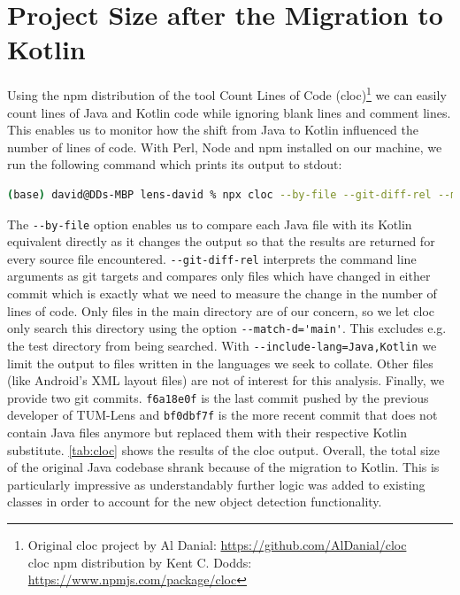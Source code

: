 \documentclass[
			   fontsize=11pt,
               paper=a4,
               bibliography=totoc,
               idxtotoc,
               headsepline,
               footsepline,
               footinclude=false,
               BCOR=12mm,
               DIV=13,
               openany,   %
               ]
               {scrbook}
\newcommand{\code}[1]{\lstinline[basicstyle = \ttfamily\small]{#1}} %
\begin{document}
\section{Project Size after the Migration to Kotlin} \label{sec:codeSizeAnalysis}

Using the npm distribution of the tool Count Lines of Code (cloc)\footnote{Original cloc project by Al Danial: \url{https://github.com/AlDanial/cloc} \\ cloc npm distribution by Kent C. Dodds: \url{https://www.npmjs.com/package/cloc}} we can easily count lines of Java and Kotlin code while ignoring blank lines and comment lines. This enables us to monitor how the shift from Java to Kotlin influenced the number of lines of code. With Perl, Node and npm installed on our machine, we run the following command which prints its output to stdout:

\begin{lstlisting}[style=standard, language=bash, label=code:cloc, caption={npx cloc command with its options and arguments. Prints the lines of code analysis comapring files before and after the Java to Kotlin conversion. The output was also saved as cloc.csv and can be found in lens-david/thesis/raw\_data.}]
	(base) david@DDs-MBP lens-david % npx cloc --by-file --git-diff-rel --match-d='main' --include-lang=Java,Kotlin -csv f6a18e0f 031a26a7
\end{lstlisting}

\noindent The \code{--by-file} option enables us to compare each Java file with its Kotlin equivalent directly as it changes the output so that the results are returned for every source file encountered. \code{--git-diff-rel} interprets the command line arguments as git targets and compares only files which have changed in either commit which is exactly what we need to measure the change in the number of lines of code. Only files in the main directory are of our concern, so we let cloc only search this directory using the option \code{--match-d='main'}. This excludes e.g. the test directory from being searched. With \code{--include-lang=Java,Kotlin} we limit the output to files written in the languages we seek to collate. Other files (like Android's XML layout files) are not of interest for this analysis. Finally, we provide two git commits. \code{f6a18e0f} is the last commit pushed by the previous developer of TUM-Lens and \code{bf0dbf7f} is the more recent commit that does not contain Java files anymore but replaced them with their respective Kotlin substitute. \autoref{tab:cloc} shows the results of the cloc output. Overall, the total size of the original Java codebase shrank because of the migration to Kotlin. This is particularly impressive as understandably further logic was added to existing classes in order to account for the new object detection functionality.
\end{document}
